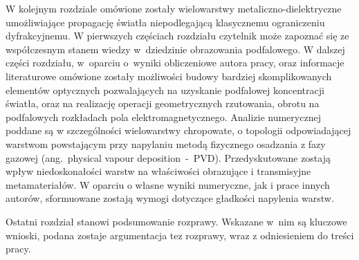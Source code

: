 W kolejnym rozdziale omówione zostały wielowarstwy metaliczno-dielektryczne umożliwiające propagację światła niepodlegającą klasycznemu ograniczeniu dyfrakcyjnemu. W pierwszych częściach rozdziału czytelnik może zapoznać się ze współczesnym stanem wiedzy w~dziedzinie obrazowania podfalowego. W dalszej części rozdziału, w~oparciu o~wyniki obliczeniowe autora pracy, oraz informacje literaturowe omówione zostały możliwości budowy bardziej skomplikowanych elementów optycznych pozwalających na uzyskanie podfalowej koncentracji światła, oraz na realizację operacji geometrycznych rzutowania, obrotu na podfalowych rozkładach pola elektromagnetycznego. Analizie numerycznej poddane są w szczególności wielowarstwy chropowate, o topologii odpowiadającej warstwom powstającym przy napylaniu metodą fizycznego osadzania z fazy gazowej (ang.~physical vapour deposition~-~PVD). Przedyskutowane zostają wpływ niedoskonałości warstw na właściwości obrazujące i transmisyjne metamateriałów. W oparciu o własne wyniki numeryczne, jak i prace innych autorów, sformuowane zostają wymogi dotyczące gładkości napylenia warstw.

Ostatni rozdział stanowi podsumowanie rozprawy. Wskazane w~nim są kluczowe wnioski, podana zostaje argumentacja tez rozprawy, wraz z odniesieniem do treści pracy.
